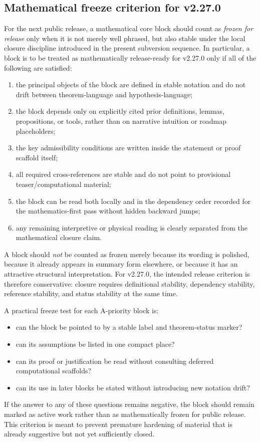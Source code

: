\subsection*{Mathematical freeze criterion for v2.27.0}
For the next public release, a mathematical core block should count as \emph{frozen for release} only when it is not merely well phrased, but also stable under the local closure discipline introduced in the present subversion sequence. In particular, a block is to be treated as mathematically release-ready for v2.27.0 only if all of the following are satisfied:
\begin{enumerate}[leftmargin=*]
  \item the principal objects of the block are defined in stable notation and do not drift between theorem-language and hypothesis-language;
  \item the block depends only on explicitly cited prior definitions, lemmas, propositions, or tools, rather than on narrative intuition or roadmap placeholders;
  \item the key admissibility conditions are written inside the statement or proof scaffold itself;
  \item all required cross-references are stable and do not point to provisional teaser/computational material;
  \item the block can be read both locally and in the dependency order recorded for the mathematics-first pass without hidden backward jumps;
  \item any remaining interpretive or physical reading is clearly separated from the mathematical closure claim.
\end{enumerate}
A block should \emph{not} be counted as frozen merely because its wording is polished, because it already appears in summary form elsewhere, or because it has an attractive structural interpretation. For v2.27.0, the intended release criterion is therefore conservative: closure requires definitional stability, dependency stability, reference stability, and status stability at the same time.

A practical freeze test for each A-priority block is:
\begin{itemize}[leftmargin=*]
  \item can the block be pointed to by a stable label and theorem-status marker?
  \item can its assumptions be listed in one compact place?
  \item can its proof or justification be read without consulting deferred computational scaffolds?
  \item can its use in later blocks be stated without introducing new notation drift?
\end{itemize}
If the answer to any of these questions remains negative, the block should remain marked as active work rather than as mathematically frozen for public release. This criterion is meant to prevent premature hardening of material that is already suggestive but not yet sufficiently closed.


